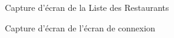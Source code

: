 \begin{figure}[H]
    \label{fig-liste-restaurants}
    \noindent{}
    \caption{Capture d'écran de la Liste des Restaurants}
\end{figure}

\begin{figure}[H]
    \label{fig-login}
    \noindent{}
    \caption{Capture d'écran de l'écran de connexion}
\end{figure}

